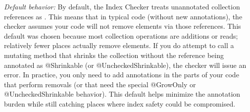 \emph{Default behavior:} By default, the Index Checker treats unannotated collection references
as . This means that in typical code (without
new annotations), the checker assumes your code will not remove elements via those references.
This default was chosen because most collection operations are additions or reads; relatively
fewer places actually remove elements. If you do attempt to call a mutating method that shrinks
the collection without the reference being annotated as @Shrinkable (or @UncheckedShrinkable),
the checker will issue an error. In practice, you only need to add annotations in the parts of
your code that perform removals (or that need the special @GrowOnly or @UncheckedShrinkable
behavior). This default helps minimize the annotation burden while still catching places where
index safety could be compromised.


